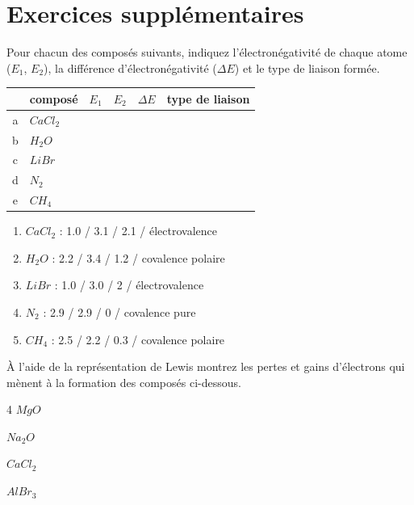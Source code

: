 \documentclass[
  11pt,
  a4paper,
  openany]{book}
\begin{document}
\section{Exercices supplémentaires}\label{exercices-suppluxe9mentaires-5}

\begin{Exercise}
Pour chacun des composés suivants, indiquez l'électronégativité de chaque atome (\(E_1\), \(E_2\)), la différence d'électronégativité (\(\Delta E\)) et le type de liaison formée.

\end{Exercise}

\begin{longtable}[]{@{}clcccc@{}}
\toprule\noalign{}
& composé & \(E_1\) & \(E_2\) & \(\Delta E\) & type de liaison \\
\midrule\noalign{}
\endhead
\bottomrule\noalign{}
\endlastfoot
a & \(CaCl_2\) & & & & \\
b & \(H_2O\) & & & & \\
c & \(LiBr\) & & & & \\
d & \(N_2\) & & & & \\
e & \(CH_4\) & & & & \\
\end{longtable}

\begin{Answer}

\begin{enumerate}
\def\labelenumi{\alph{enumi}.}
\item
  \(CaCl_2\) : 1.0 / 3.1 / 2.1 / électrovalence
\item
  \(H_2O\) : 2.2 / 3.4 / 1.2 / covalence polaire
\item
  \(LiBr\) : 1.0 / 3.0 / 2 / électrovalence
\item
  \(N_2\) : 2.9 / 2.9 / 0 / covalence pure
\item
  \(CH_4\) : 2.5 / 2.2 / 0.3 / covalence polaire
\end{enumerate}

\end{Answer}

\begin{Exercise}

À l'aide de la représentation de Lewis montrez les pertes et gains d'électrons qui mènent à la formation des composés ci-dessous.

\begin{multicols}{4}
\(MgO\)

\(Na_2O\)

\(CaCl_2\)

\(AlBr_3\)

\end{multicols}


\end{Exercise}
\end{document}
